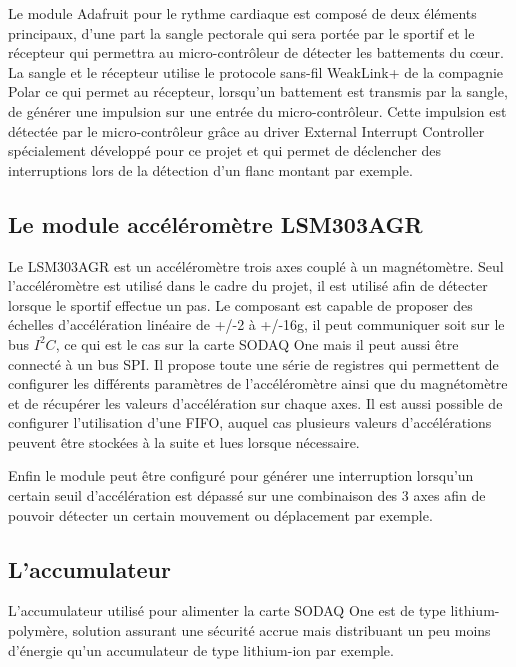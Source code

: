 Le module Adafruit pour le rythme cardiaque est composé de deux éléments principaux, d'une part la sangle pectorale qui sera portée par le sportif et le récepteur qui permettra au micro-contrôleur de détecter les battements du cœur. La sangle et le récepteur utilise le protocole sans-fil WeakLink+ de la compagnie Polar ce qui permet au récepteur, lorsqu'un battement est transmis par la sangle, de générer une impulsion sur une entrée du micro-contrôleur. Cette impulsion est détectée par le micro-contrôleur grâce au driver External Interrupt Controller spécialement développé pour ce projet et qui permet de déclencher des interruptions lors de la détection d'un flanc montant par exemple.


\subsection{Le module accéléromètre LSM303AGR}\label{ch:module_lsm303agr}


Le LSM303AGR est un accéléromètre trois axes couplé à un magnétomètre. Seul l'accéléromètre est utilisé dans le cadre du projet, il est utilisé afin de détecter lorsque le sportif effectue un pas. Le composant est capable de proposer des échelles d'accélération linéaire de +/-2 à +/-16g, il peut communiquer soit sur le bus $I^{2}C$, ce qui est le cas sur la carte SODAQ One mais il peut aussi être connecté à un bus SPI. Il propose toute une série de registres qui permettent de configurer les différents paramètres de l'accéléromètre ainsi que du magnétomètre et de récupérer les valeurs d'accélération sur chaque axes. Il est aussi possible de configurer l'utilisation d'une FIFO, auquel cas plusieurs valeurs d'accélérations peuvent être stockées à la suite et lues lorsque nécessaire.

Enfin le module peut être configuré pour générer une interruption lorsqu'un certain seuil d'accélération est dépassé sur une combinaison des 3 axes afin de pouvoir détecter un certain mouvement ou déplacement par exemple. 

\subsection{L'accumulateur}


L'accumulateur utilisé pour alimenter la carte SODAQ One est de type lithium-polymère, solution assurant une sécurité accrue mais distribuant un peu moins d'énergie qu'un accumulateur de type lithium-ion par exemple.

